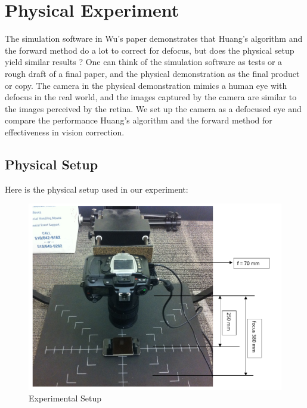 \chapter{Physical Experiment}

The simulation software in Wu's paper demonstrates that Huang's algorithm and the forward method do a lot to correct for defocus, but does the physical setup yield similar results \cite{Wu:EECS-2016-67}? One can think of the simulation software as tests or a rough draft of a final paper, and the physical demonstration as the final product or copy. The camera in the physical demonstration mimics a human eye with defocus in the real world, and the images captured by the camera are similar to the images perceived by the retina. We set up the camera as a defocused eye and compare the performance Huang's algorithm and the forward method for effectiveness in vision correction.

\section{Physical Setup}

Here is the physical setup used in our experiment: 

\begin{figure}[ht]
  \centering
  \includegraphics[width=5in]{chapters/chapter5/images/Setup.png}
  \caption{Experimental Setup}
  \label{fig:physical_setup}
\end{figure}
 
